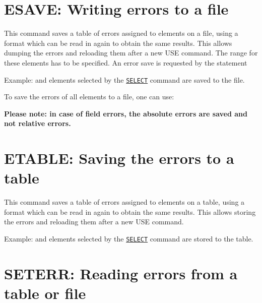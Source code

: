 
%

\section{ESAVE: Writing errors to a file}
\label{sec:esave}


This command saves a table of errors assigned to elements on a file,
using a format which can be read in again to obtain the same
results. This allows dumping the errors and reloading them after a new
USE command. The range for these elements has to be specified. An error
save is requested by the statement  

Example: 
and elements selected by the  \hyperref[sec:select]{\texttt{SELECT}}
command are saved to the file.  


To save the errors of all elements to a file, one can use: 

\textbf{Please note: in case of field errors, the absolute errors are
  saved and not relative errors. } 

\section{ETABLE: Saving the errors to a table}
\label{sec:esave}


This command saves a table of errors assigned to elements on a table,
using a format which can be read in again to obtain the same
results. This allows storing the errors and reloading them after a new
USE command. 

Example: 
and elements selected by the  \hyperref[sec:select]{\texttt{SELECT}}
command are stored to the table.  


\section{SETERR: Reading errors from a table or file}
\label{sec:seterr}

